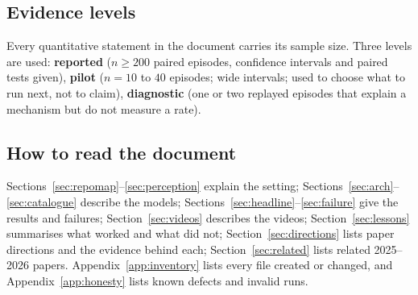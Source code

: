 \subsection{Evidence levels}
Every quantitative statement in the document carries its sample size. Three levels are used:
\textbf{reported} ($n\ge 200$ paired episodes, confidence intervals and paired tests given),
\textbf{pilot} ($n=10$ to $40$ episodes; wide intervals; used to choose what to run next, not to claim),
\textbf{diagnostic} (one or two replayed episodes that explain a mechanism but do not measure a rate).

\subsection{How to read the document}
Sections~\ref{sec:repomap}--\ref{sec:perception} explain the setting; Sections~\ref{sec:arch}--\ref{sec:catalogue} describe the models; Sections~\ref{sec:headline}--\ref{sec:failure}
give the results and failures; Section~\ref{sec:videos} describes the videos; Section~\ref{sec:lessons} summarises what worked and what did not; Section~\ref{sec:directions} lists
paper directions and the evidence behind each; Section~\ref{sec:related} lists related 2025--2026 papers. Appendix~\ref{app:inventory} lists every file created or changed, and
Appendix~\ref{app:honesty} lists known defects and invalid runs.
